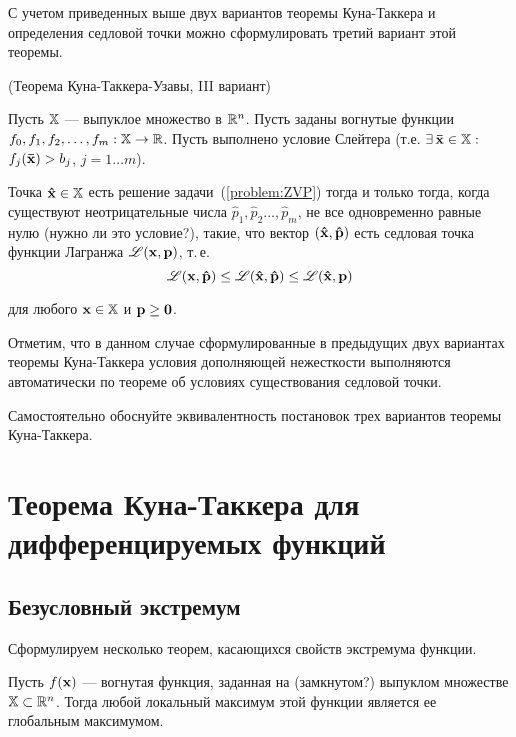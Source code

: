 С учетом приведенных выше двух вариантов теоремы Куна-Таккера и
определения седловой точки можно сформулировать третий вариант этой
теоремы.

\begin{teop}(Теорема Куна-Таккера-Узавы, III вариант)

Пусть $\mathbb{X}$ --- выпуклое множество в $\mathbb{R}^n$. Пусть заданы
вогнутые функции $f_0, f_1, f_2, \ldots, f_m: \mathbb{X} \to \mathbb{R}$. Пусть
выполнено условие Слейтера (т.е. $\exists \, \mathbf{\bar x} \in
\mathbb{X}:$ ${f_j(\mathbf{\bar x}) > b_j}$, ${j=1 \ldots m}$).

Точка $\mathbf{\hat x}\in \mathbb{X}$ есть решение
задачи~(\ref{problem:ZVP}) тогда и только тогда, когда существуют
неотрицательные числа $\hat p_1, \hat p_2 \ldots, \hat p_m$, не все
одновременно равные нулю (нужно ли это условие?), такие, что вектор
$(\mathbf{\hat x}, \mathbf{\hat p})$ есть седловая точка функции Лагранжа
$\mathscr{L}(\mathbf{x}, \mathbf{p})$, т.\,е.
\[
\mathscr{L}(\mathbf{x}, \mathbf{\hat p}) \leq \mathscr{L}(\mathbf{\hat x}, \mathbf{\hat p}) \leq
\mathscr{L}(\mathbf{\hat x}, \mathbf{p})
\]

\noindent для любого $\mathbf{x} \in \mathbb{X}$ и $\mathbf{p} \geq \mathbf{0}$.

\end{teop}

Отметим, что в данном случае сформулированные в предыдущих двух
вариантах теоремы Куна-Таккера условия дополняющей нежесткости
выполняются автоматически по теореме об условиях существования
седловой точки.

\begin{exer}
Самостоятельно обоснуйте эквивалентность постановок трех вариантов
теоремы Куна-Таккера.
\end{exer}

\section{Теорема Куна-Таккера для дифференцируемых функций}

\subsection{Безусловный экстремум}



Сформулируем несколько теорем, касающихся свойств экстремума функции.


\begin{teo}
Пусть $f(\mathbf{x})$ --- вогнутая функция, заданная на (замкнутом?)
выпуклом множестве $\mathbb{X} \subset \mathbb{R}^n$. Тогда любой локальный
максимум этой функции является ее глобальным максимумом.
\end{teo}

